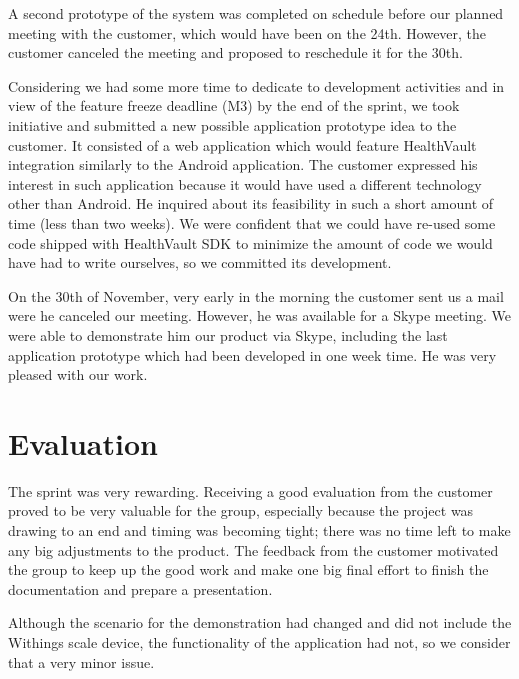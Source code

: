 A second prototype of the system was completed on schedule before our
planned meeting with the customer, which would have been on the 24th.
However, the customer canceled the meeting and proposed to reschedule it for the 30th.

Considering we had some more time to dedicate to development activities and in view
of the feature freeze deadline (M3) by the end of the sprint, we took initiative
and submitted a new possible application prototype idea to the customer.
It consisted of a web application which would feature HealthVault integration
similarly to the Android application.
The customer expressed his interest in such application because it would have
used a different technology other than Android. He inquired about its feasibility
in such a short amount of time (less than two weeks). We were confident that we
could have re-used some code shipped with HealthVault SDK to minimize the amount
of code we would have had to write ourselves, so we committed its development.

On the 30th of November, very early in the morning the customer sent us a mail
were he canceled our meeting. However, he was available for a Skype meeting.
We were able to demonstrate him our product via Skype, including the last application
prototype which had been developed in one week time. He was very pleased with our work.

\section{Evaluation}

The sprint was very rewarding.
Receiving a good evaluation from the customer proved to be very valuable for the group,
especially because the project was drawing to an end and timing was becoming tight;
there was no time left to make any big adjustments to the product.
The feedback from the customer motivated the group to keep up the good work
and make one big final effort to finish the documentation and prepare a presentation.

Although the scenario for the demonstration had changed and did not include
the Withings scale device, the functionality of the application had not,
so we consider that a very minor issue.

